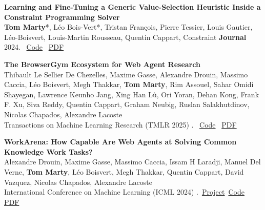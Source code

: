 \documentclass[letterpaper,11pt]{article}
\begin{document}
\begin{tcolorbox}[enhanced, rounded corners, colback=white, colframe=black!10!white, boxrule=0.5mm, left=10pt, right=10pt, top=6pt, bottom=3pt]
    \textbf{Learning and Fine-Tuning a Generic Value-Selection Heuristic Inside a Constraint Programming Solver} \\
    \textbf{Tom Marty}*, Léo Bois-Vert*, Tristan François, Pierre Tessier, Louis Gautier, Léo-Boisvert, Louis-Martin Rousseau, Quentin Cappart, Constraint \textbf{Journal} 2024.
 \hfill \faCode  \, \href{https://github.com/corail-research/SeaPearl.jl}{Code} \quad\faFilePdf \, \href{https://link.springer.com/article/10.1007/s10601-024-09377-4}{PDF}
\end{tcolorbox}

\begin{tcolorbox}[enhanced, rounded corners, colback=white, colframe=black!10!white, boxrule=0.5mm, left=10pt, right=10pt, top=6pt, bottom=3pt]
    \textbf{The BrowserGym Ecosystem for Web Agent Research} \\
    Thibault Le Sellier De Chezelles, Maxime Gasse, Alexandre Drouin, Massimo Caccia, Léo Boisvert, Megh Thakkar, \textbf{Tom Marty}, Rim Assouel, Sahar Omidi Shayegan, Lawrence Keunho Jang, Xing Han Lù, Ori Yoran, Dehan Kong, Frank F. Xu, Siva Reddy, Quentin Cappart, Graham Neubig, Ruslan Salakhutdinov, Nicolas Chapados, Alexandre Lacoste \\
        Transactions on Machine Learning Research (TMLR 2025) . \hfill  \faCode  \, \href{https://github.com/ServiceNow/BrowserGym}{Code} \quad
    \faFilePdf \, \href{https://arxiv.org/abs/2412.05467}{PDF}
\end{tcolorbox}

\begin{tcolorbox}[enhanced, rounded corners, colback=white, colframe=black!10!white, boxrule=0.5mm, left=10pt, right=10pt, top=6pt, bottom=3pt]
    \textbf{WorkArena: How Capable Are Web Agents at Solving Common Knowledge Work Tasks?} \\
    Alexandre Drouin, Maxime Gasse, Massimo Caccia, Issam H Laradji, Manuel Del Verne, \textbf{Tom Marty}, Léo Boisvert, Megh Thakkar, Quentin Cappart, David Vazquez, Nicolas Chapados, Alexandre Lacoste \\
    International Conference on Machine Learning (ICML 2024) .  \hfill
\faLink \,\href{https://servicenow.github.io/WorkArena/}{Project}\quad \faCode\, \href{https://github.com/ServiceNow/WorkArena}{Code}\quad \faFilePdf \, \href{https://openreview.net/forum?id=BRfqYrikdo}{PDF}
\end{tcolorbox}
\end{document}
